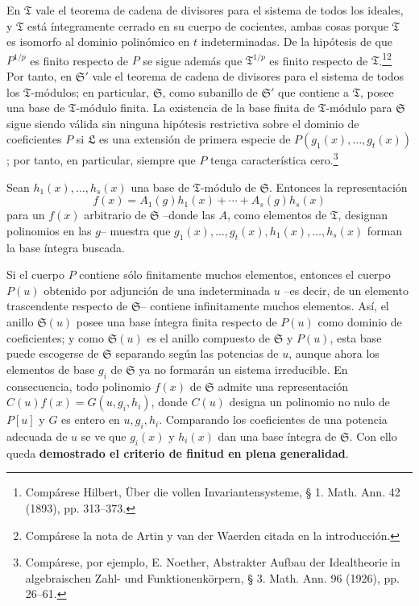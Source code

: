 \documentclass[11pt]{article}
\begin{document}
En $\mathfrak T$ vale el teorema de cadena de divisores para el sistema de todos los ideales, y $\mathfrak T$ está íntegramente cerrado en su cuerpo de cocientes, ambas cosas porque $\mathfrak T$ es isomorfo al dominio polinómico en $t$ indeterminadas. De la hipótesis de que $P^{1/p}$ es finito respecto de $P$ se sigue además que $\mathfrak T^{1/p}$ es finito respecto de $\mathfrak T$.\footnote{Compárese Hilbert, Über die vollen Invariantensysteme, § 1. Math. Ann. 42 (1893), pp. 313--373.}\footnote{Compárese la nota de Artin y van der Waerden citada en la introducción.} Por tanto, en $\mathfrak S'$ vale el teorema de cadena de divisores para el sistema de todos los $\mathfrak T$-módulos; en particular, $\mathfrak S$, como subanillo de $\mathfrak S'$ que contiene a $\mathfrak T$, posee una base de $\mathfrak T$-módulo finita. La existencia de la base finita de $\mathfrak T$-módulo para $\mathfrak S$ sigue siendo válida sin ninguna hipótesis restrictiva sobre el dominio de coeficientes $P$ si $\mathfrak L$ es una extensión de primera especie de $P(g_1(x),\ldots,g_t(x))$; por tanto, en particular, siempre que $P$ tenga característica cero.\footnote{Compárese, por ejemplo, E. Noether, Abstrakter Aufbau der Idealtheorie in algebraischen Zahl- und Funktionenkörpern, § 3. Math. Ann. 96 (1926), pp. 26--61.}

Sean $h_1(x),\ldots,h_s(x)$ una base de $\mathfrak T$-módulo de $\mathfrak S$. Entonces la representación
\[
 f(x)=A_1(g)h_1(x)+\cdots+A_s(g)h_s(x)
\]
para un $f(x)$ arbitrario de $\mathfrak S$ --donde las $A$, como elementos de $\mathfrak T$, designan polinomios en las $g$-- muestra que $g_1(x),\ldots,g_t(x),h_1(x),\ldots,h_s(x)$ forman la base íntegra buscada.

Si el cuerpo $P$ contiene sólo finitamente muchos elementos, entonces el cuerpo $P(u)$ obtenido por adjunción de una indeterminada $u$ --es decir, de un elemento trascendente respecto de $\mathfrak S$-- contiene infinitamente muchos elementos. Así, el anillo $\mathfrak S(u)$ posee una base íntegra finita respecto de $P(u)$ como dominio de coeficientes; y como $\mathfrak S(u)$ es el anillo compuesto de $\mathfrak S$ y $P(u)$, esta base puede escogerse de $\mathfrak S$ separando según las potencias de $u$, aunque ahora los elementos de base $g_i$ de $\mathfrak S$ ya no formarán un sistema irreducible. En consecuencia, todo polinomio $f(x)$ de $\mathfrak S$ admite una representación $C(u)f(x)=G(u,g_i,h_i)$, donde $C(u)$ designa un polinomio no nulo de $P[u]$ y $G$ es entero en $u,g_i,h_i$. Comparando los coeficientes de una potencia adecuada de $u$ se ve que $g_i(x)$ y $h_i(x)$ dan una base íntegra de $\mathfrak S$. Con ello queda \textbf{demostrado el criterio de finitud en plena generalidad}.
\end{document}
